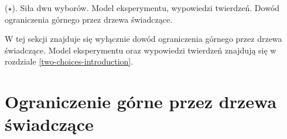 {
\makeatletter
{}
\makeatother
\graphicspath{{../probabil}}

\begin{questiontext}
	(\(\star\)). Siła dwu wyborów. Model eksperymentu, wypowiedzi twierdzeń. Dowód ograniczenia górnego przez drzewa świadczące.
\end{questiontext}

W tej sekcji znajduje się wyłącznie dowód ograniczenia górnego przez drzewa świadczące. Model eksperymentu oraz wypowiedzi twierdzeń znajdują się w rozdziale \ref{two-choices-introduction}.

\section{Ograniczenie górne przez drzewa świadczące}

}